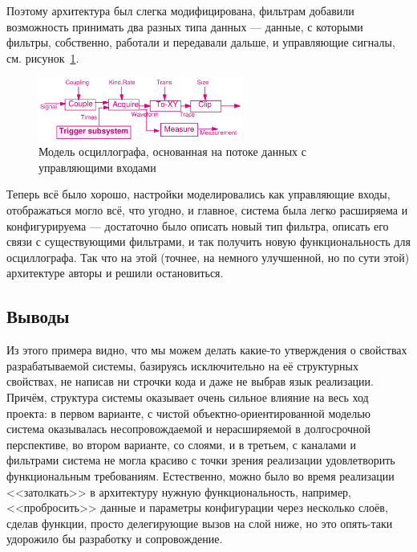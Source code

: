 \documentclass{../../text-style}
\begin{document}
Поэтому архитектура был слегка модифицирована, фильтрам добавили возможность принимать два разных типа данных --- данные, с которыми фильтры, собственно, работали и передавали дальше, и управляющие сигналы, см. рисунок~\ref{figure:oscilloscopeModifiedFilters}.

\begin{figure}
    \begin{center}
        \includegraphics[width=0.6\textwidth]{oscilloscopeModifiedFilters.png}
    \end{center}
    \caption{Модель осциллографа, основанная на потоке данных с управляющими входами}
    \label{figure:oscilloscopeModifiedFilters}
\end{figure}

Теперь всё было хорошо, настройки моделировались как управляющие входы, отображаться могло всё, что угодно, и главное, система была легко расширяема и конфигурируема --- достаточно было описать новый тип фильтра, описать его связи с существующими фильтрами, и так получить новую функциональность для осциллографа. Так что на этой (точнее, на немного улучшенной, но по сути этой) архитектуре авторы и решили остановиться.

\subsection{Выводы}

Из этого примера видно, что мы можем делать какие-то утверждения о свойствах разрабатываемой системы, базируясь исключительно на её структурных свойствах, не написав ни строчки кода и даже не выбрав язык реализации. Причём, структура системы оказывает очень сильное влияние на весь ход проекта: в первом варианте, с чистой объектно-ориентированной моделью система оказывалась несопровождаемой и нерасширяемой в долгосрочной перспективе, во втором варианте, со слоями, и в третьем, с каналами и фильтрами система не могла красиво с точки зрения реализации удовлетворить функциональным требованиям. Естественно, можно было во время реализации <<затолкать>> в архитектуру нужную функциональность, например, <<пробросить>> данные и параметры конфигурации через несколько слоёв, сделав функции, просто делегирующие вызов на слой ниже, но это опять-таки удорожило бы разработку и сопровождение.
\end{document}
